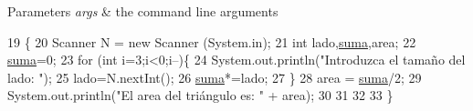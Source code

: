 \begin{DoxyParams}{Parameters}
{\em args} & the command line arguments \\
\hline
\end{DoxyParams}

\begin{DoxyCode}
19                                            \{
20     Scanner N = \textcolor{keyword}{new} Scanner (System.in);
21     \textcolor{keywordtype}{int} lado,\mbox{\hyperlink{namespacesuma}{suma}},area;
22     \mbox{\hyperlink{namespacesuma}{suma}}=0;
23     \textcolor{keywordflow}{for} (\textcolor{keywordtype}{int} i=3;i<0;i--)\{
24         System.out.println(\textcolor{stringliteral}{"Introduzca el tamaño del lado: "});
25             lado=N.nextInt();
26         \mbox{\hyperlink{namespacesuma}{suma}}*=lado;
27     \}
28     area = \mbox{\hyperlink{namespacesuma}{suma}}/2;
29     System.out.println(\textcolor{stringliteral}{"El area del triángulo es: "} + area);
30         
31     
32         
33     \}
\end{DoxyCode}
